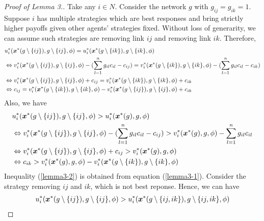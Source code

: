 \documentclass[12pt]{article}
\theoremstyle{definition}
\begin{document}
\begin{proof}[Proof of Lemma 3.]
	Take any $i \in N$.
	Consider the network $g$ with $g_{ij} = g_{ik} = 1$.
	Suppose $i$ has multiple strategies which are best responses and bring strictly higher payoffs given other agents' strategies fixed.
	Without loss of generarity, we can assume such strategies are removing link $ij$ and removing link $ik$.
	Therefore,
	\begin{align}
		\label{lemma3-1}
		& u_i^*(\bm{x}^*(g \setminus \{ij\}), g \setminus \{ij\}, \phi) = u_i^*(\bm{x}^*(g \setminus \{ik\}), g \setminus \{ik\}, \phi) \notag \\
			& \Leftrightarrow v_i^*(\bm{x}^*(g \setminus \{ij\}), g \setminus \{ij\}, \phi) - (\sum_{l=1}^n g_{il} c_{il} - c_{ij}) = v_i^*(\bm{x}^*(g \setminus \{ik\}), g \setminus \{ik\}, \phi) - (\sum_{l=1}^n g_{il} c_{il} - c_{ik}) \notag \\
			& \Leftrightarrow v_i^*(\bm{x}^*(g \setminus \{ij\}), g \setminus \{ij\}, \phi) + c_{ij} = v_i^*(\bm{x}^*(g \setminus \{ik\}), g \setminus \{ik\}, \phi) + c_{ik} \notag \\
			& \Leftrightarrow c_{ij} = v_i^*(\bm{x}^*(g \setminus \{ik\}), g \setminus \{ik\}, \phi) - v_i^*(\bm{x}^*(g \setminus \{ij\}), g \setminus \{ij\}, \phi) + c_{ik}
	\end{align}
	Also, we have
	\begin{align}
		\label{lemma3-2}
		& u_i^*(\bm{x}^*(g \setminus \{ij\}), g \setminus \{ij\}, \phi) > u_i^*(\bm{x}^*(g), g, \phi) \notag \\
			& \Leftrightarrow v_i^*(\bm{x}^*(g \setminus \{ij\}), g \setminus \{ij\}, \phi) - (\sum_{l=1}^n g_{il} c_{il} - c_{ij}) > v_i^*(\bm{x}^*(g), g, \phi) - \sum_{l=1}^n g_{il} c_{il} \notag \\
			& \Leftrightarrow v_i^*(\bm{x}^*(g \setminus \{ij\}), g \setminus \{ij\}, \phi) + c_{ij} > v_i^*(\bm{x}^*(g), g, \phi) \notag \\
			& \Leftrightarrow c_{ik} > v_i^*(\bm{x}^*(g), g, \phi) - v_i^*(\bm{x}^*(g \setminus \{ik\}), g \setminus \{ik\}, \phi)
	\end{align}
	Inequality (\ref{lemma3-2}) is obtained from equation (\ref{lemma3-1}).
	Consider the strategy removing $ij$ and $ik$, which is not best reponse.
	Hence, we can have
	\begin{align}
		\label{lemma3-3}
		& u_i^*(\bm{x}^*(g \setminus \{ij\}), g \setminus \{ij\}, \phi) > u_i^*(\bm{x}^*(g \setminus \{ij,ik\}), g \setminus \{ij,ik\}, \phi) \notag \\

\end{align}
\end{proof}
\end{document}
